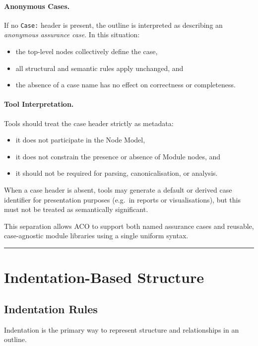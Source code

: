 \documentclass[11pt]{article}
\begin{document}
\paragraph{Anonymous Cases.}
If no \texttt{Case:} header is present, the outline is interpreted as describing an
\emph{anonymous assurance case}. In this situation:
\begin{itemize}[leftmargin=2em]
  \item the top-level nodes collectively define the case,
  \item all structural and semantic rules apply unchanged, and
  \item the absence of a case name has no effect on correctness or completeness.
\end{itemize}

\paragraph{Tool Interpretation.}
Tools should treat the case header strictly as metadata:
\begin{itemize}[leftmargin=2em]
  \item it does not participate in the Node Model,
  \item it does not constrain the presence or absence of Module nodes, and
  \item it should not be required for parsing, canonicalisation, or analysis.
\end{itemize}

When a case header is absent, tools may generate a default or derived case identifier
for presentation purposes (e.g.\ in reports or visualisations), but this must not be
treated as semantically significant.

This separation allows ACO to support both named assurance cases and reusable,
case-agnostic module libraries using a single uniform syntax.

\bigskip
\hrule
\bigskip

\section{Indentation-Based Structure}

\subsection{Indentation Rules}

Indentation is the primary way to represent structure and relationships in an outline.
\end{document}
